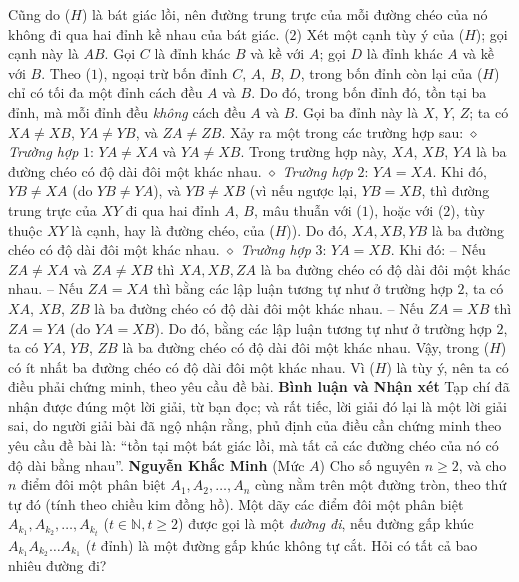 \begin{multicols}{2}
	\vskip 0.05cm
	Cũng do ($H$) là bát giác lồi, nên đường trung trực của mỗi đường chéo của nó không đi qua hai đỉnh kề nhau của bát giác.                 \hfill ($2$)
	\vskip 0.05cm
	Xét một cạnh tùy ý của ($H$); gọi cạnh này là $AB$. Gọi $C$ là đỉnh khác $B$ và kề với $A$; gọi $D$ là đỉnh khác $A$ và kề với $B$.
	\vskip 0.05cm
	Theo ($1$), ngoại trừ bốn đỉnh $C$, $A$, $B$, $D$, trong bốn đỉnh còn lại của ($H$) chỉ có tối đa một đỉnh cách đều $A$ và $B$. Do đó, trong bốn đỉnh đó, tồn tại ba đỉnh, mà mỗi đỉnh đều \textit{không} cách đều $A$ và $B$. Gọi ba đỉnh này là $X$, $Y$, $Z$; ta có $XA \ne XB$, $YA \ne YB$, và $ZA \ne ZB$. Xảy ra một trong các trường hợp sau:
	\vskip 0.05cm
	$\diamond$ \textit{Trường hợp} $1$: $YA \ne XA$ và $YA \ne XB$.
	\vskip 0.05cm
	Trong trường hợp này, $XA$, $XB$, $YA$ là ba đường chéo có độ dài đôi một khác nhau.
	\vskip 0.05cm
	$\diamond$ \textit{Trường hợp} $2$: $YA = XA$.
	\vskip 0.05cm
	Khi đó, $YB \ne XA$ (do $YB \ne YA$), và \linebreak$YB \ne XB$ (vì nếu ngược lại, $YB = XB$, thì đường trung trực của $XY$ đi qua hai đỉnh $A$, $B$, mâu thuẫn với ($1$), hoặc với ($2$), tùy thuộc $XY$ là cạnh, hay là đường chéo, của ($H$)). Do đó, $XA, XB, YB$ là ba đường chéo có độ dài đôi một khác nhau.
	\vskip 0.05cm
	$\diamond$ \textit{Trường hợp} $3$: $YA = XB$.
	\vskip 0.05cm
	Khi đó:
	\vskip 0.05cm
	-- Nếu $ZA \ne XA$ và $ZA \ne XB$ thì $XA, XB, ZA$ là ba đường chéo có độ dài đôi một khác nhau.
	\vskip 0.05cm
	-- Nếu $ZA = XA$ thì bằng các lập luận tương tự như ở trường hợp $2$, ta có $XA$, $XB$, $ZB$ là ba đường chéo có độ dài đôi một khác nhau.
	\vskip 0.05cm
	-- Nếu $ZA = XB$ thì $ZA = YA$ (do $YA = XB$). Do đó, bằng các lập luận tương tự như ở trường hợp $2$, ta có $YA$, $YB$, $ZB$ là ba đường chéo có độ dài đôi một khác nhau.
	\vskip 0.05cm
	Vậy, trong ($H$) có ít nhất ba đường chéo có độ dài đôi một khác nhau.
	\vskip 0.05cm
	Vì ($H$) là tùy ý, nên ta có điều phải chứng minh, theo yêu cầu đề bài.
	\vskip 0.05cm
	\textbf{\color{thachthuctoanhoc}Bình luận và Nhận xét}
	\vskip 0.05cm
	Tạp chí đã nhận được đúng một lời giải, từ bạn đọc; và rất tiếc, lời giải đó lại là một lời giải sai, do người giải bài đã ngộ nhận rằng, phủ định của điều cần chứng minh theo yêu cầu đề bài là: “tồn tại một bát giác lồi, mà tất cả các đường chéo của nó có độ dài bằng nhau”.
	\vskip 0.2cm
	\hfill\textbf{\color{thachthuctoanhoc}Nguyễn Khắc Minh}
	\vskip 0.2cm
	{}
	(Mức $A$) Cho số nguyên $n \ge 2$, và cho $n$ điểm đôi một phân biệt  $A_1, A_2, \ldots, A_n$   cùng nằm trên một đường tròn, theo thứ tự đó (tính theo chiều kim đồng hồ). Một dãy các điểm đôi một phân biệt  $A_{k_1}, A_{k_2}, \ldots, A_{k_t}$ ($t \in \mathbb{N}, t \ge 2$) được gọi là một \textit{đường đi}, nếu đường gấp khúc $A_{k_1}A_{k_2}\ldots A_{k_1}$ ($t$ đỉnh) là một đường gấp khúc không tự cắt. Hỏi có tất cả bao nhiêu đường đi?

\end{multicols}
